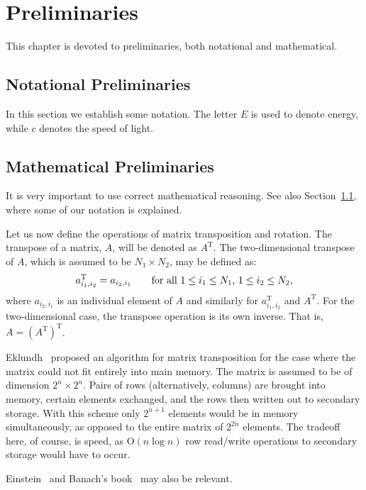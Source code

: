 \chapter{Preliminaries}
This chapter is devoted to preliminaries, both notational and
mathematical.

\section{Notational Preliminaries}
\label{sec:notation}
In this section we establish some notation.  The letter $E$ is used
to denote energy, while $c$ denotes the speed of light.

\section{Mathematical Preliminaries}
It is very important to use correct mathematical reasoning.
See also Section~\ref{sec:notation}, where some of our notation is
explained.

Let us now define the operations of matrix transposition and rotation.  The
transpose of a matrix, $A$, will be denoted as $A^{\mathrm T}$.  The
two-dimensional transpose of $A$, which is assumed to be $N_1 \times N_2$, may
be defined as:
\begin{equation}
a^{\mathrm T}_{i_1,i_2} = a_{i_2,i_1} \qquad
\hbox{for all $1 \leq i_1 \leq N_1$, $1 \leq i_2 \leq N_2$,}
\end{equation}
where $a_{i_2,i_1}$ is an individual element of $A$ and similarly for
$a^{\mathrm T}_{i_1,i_2}$ and $A^{\mathrm T}$.
For the two-dimensional case, the transpose operation is its own inverse.
That is, $A = (A^{\mathrm T})^{\mathrm T}$.

Eklundh~\cite{eklundh:ar72a} proposed an
algorithm for matrix transposition for the case where the matrix could
not fit entirely into main memory.  The matrix is assumed to be of
dimension $2^n \times 2^n$.  Pairs of rows (alternatively, columns)
are brought into memory, certain elements exchanged, and the rows then
written out to secondary storage.  With this scheme only $2^{n+1}$
elements would be in memory simultaneously, as opposed to the entire
matrix of $2^{2n}$ elements.  The tradeoff here, of course, is speed,
as O$(n \log n)$ row read/write operations to secondary storage would
have to occur.

Einstein~\cite{einstein} and Banach's book~\cite{banach-english} may
also be relevant.

